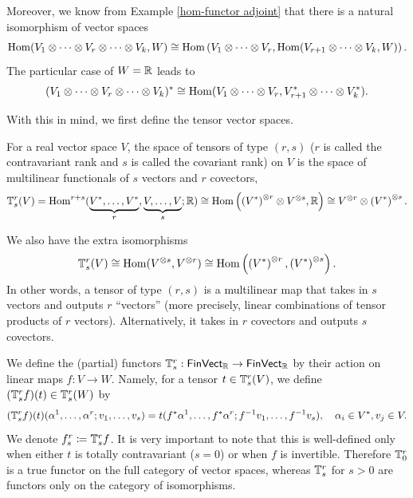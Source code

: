 Moreover, we know from Example \ref{hom-functor adjoint} that there is a natural isomorphism of vector spaces
\[
\operatorname{Hom}(V_1\otimes\cdots\otimes V_r\otimes\cdots\otimes V_k,W)\cong\operatorname{Hom}\left(V_1\otimes\cdots\otimes V_r,\operatorname{Hom}(V_{r+1}\otimes\cdots\otimes V_k,W)\right).
\]
The particular case of $W=\mathbb{R} $ leads to 
\[
(V_1\otimes\cdots\otimes V_r\otimes\cdots\otimes V_k)^\ast\cong\operatorname{Hom}(V_1\otimes\cdots\otimes V_r,V_{r+1}^\ast\otimes\cdots\otimes V_k^\ast).
\]

With this in mind, we first define the tensor vector spaces.

\begin{defn}[Tensors]
    For a real vector space $V$, the space of tensors of type $(r,s)$ ($r$ is called the contravariant rank and $s$ is called the covariant rank) on $V$ is the space of multilinear functionals of $s$ vectors and $r$ covectors, \[\mathbb{T}^r_s(V)=\operatorname{Hom}^{r+s}(\underbrace{V^\ast,\ldots,V^\ast}_{r},\underbrace{V,\ldots,V}_s;\mathbb{R} )\cong\operatorname{Hom} \left(\left(V^\ast\right)^{\otimes r}\otimes V^{\otimes s},\mathbb{R} \right)\cong V^{\otimes r}\otimes \left(V^\ast\right)^{\otimes s}.\]
\end{defn}

We also have the extra isomorphisms
\[
\mathbb{T}^r_s(V)\cong \operatorname{Hom}(V^{\otimes s},V^{\otimes r})\cong \operatorname{Hom}\left(\left(V^\ast\right)^{\otimes r},\left(V^\ast\right)^{\otimes s}\right).
\]
In other words, a tensor of type $(r,s)$ is a multilinear map that takes in $s$ vectors and outputs $r$ ``vectors'' (more precisely, linear combinations of tensor products of $r$ vectors). Alternatively, it takes in $r$ covectors and outputs $s$ covectors.

\begin{defn}
    We define the (partial) functors $\mathbb{T}^r_s:\mathsf{FinVect_{\mathbb{R}} }\to\mathsf{FinVect}_{\mathbb{R}} $ by their action on linear maps $f:V\to W$. Namely, for a tensor $t\in \mathbb{T}^r_s(V)$, we define $(\mathbb{T}^r_sf)(t)\in \mathbb{T}^r_s(W)$ by
    \[
    (\mathbb{T}^r_sf)(t)(\alpha^1,\ldots,\alpha^r;v_1,\ldots,v_s)=t(f^\ast\alpha^1,\ldots,f^\ast\alpha^r;f^{-1}v_1,\ldots,f^{-1}v_s), \quad \alpha_i\in V^\ast,v_j\in V.
    \]
    We denote $f^r_s\coloneqq \mathbb{T}^r_s f$. It is very important to note that this is well-defined only when either $t$ is totally contravariant ($s=0$) or when $f$ is invertible. Therefore $\mathbb{T}^r_0$ is a true functor on the full category of vector spaces, whereas $\mathbb{T}^r_s$ for $s>0$ are functors only on the category of isomorphisms.
\end{defn}


